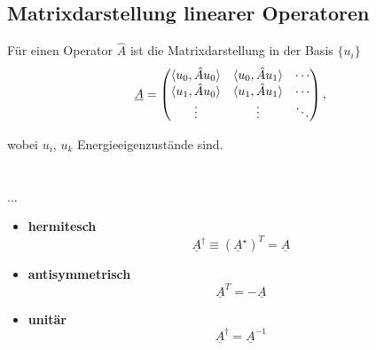 \documentclass{article}
\begin{document}


\subsection{Matrixdarstellung linearer Operatoren}
Für einen Operator $\hat{A}$ ist die Matrixdarstellung in der Basis $\{u_i\}$
	\begin{equation}
		\underline{A} =
			\begin{pmatrix}
				\braket{u_0, \hat{A} u_0} & \braket{u_0, \hat{A} u_1} & \cdots \\
				\braket{u_1, \hat{A} u_0} & \braket{u_1, \hat{A} u_1} & \cdots \\
				\vdots & \vdots & \ddots
			\end{pmatrix},
	\end{equation}

wobei $u_i$, $u_k$ Energieeigenzustände sind.\\
\\
\\
...
	\begin{itemize}
		\item \textbf{hermitesch}
			\begin{equation}
				\underline{A}^\dagger \equiv (\underline{A}^\star)^T = \underline{A}
			\end{equation}
	
		\item \textbf{antisymmetrisch}
			\begin{equation}
				\underline{A}^T = -\underline{A}
			\end{equation}
		
		\item \textbf{unitär}
			\begin{equation}
				\underline{A}^\dagger = \underline{A}^{-1}
			\end{equation}
	\end{itemize}


\newpage
\end{document}
